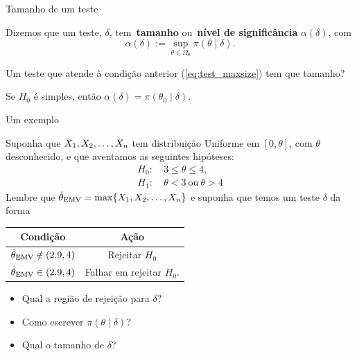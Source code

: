  
\begin{frame}{Tamanho de um teste}
 \begin{defn}
 Dizemos que um teste, $\delta$, tem~\textbf{tamanho} ou~\textbf{nível de significância} $\alpha(\delta)$, com 
 \begin{equation*}
  \alpha(\delta) := \sup_{\theta \in \Omega_0} \pi(\theta \mid \delta).
 \end{equation*}
 \end{defn}
Um teste que atende à condição anterior (\ref{eq:test_maxsize}) tem que tamanho?

\begin{obs}
 Se $H_0$ é simples, então $\alpha(\delta) = \pi(\theta_0 \mid \delta)$.
\end{obs}

\end{frame}

\begin{frame}{Um exemplo}
 \begin{exemplo}
  Suponha que $X_1, X_2, \ldots, X_n$ tem distribuição Uniforme em $[0, \theta]$, com $\theta$ desconhecido, e que aventamos as seguintes hipóteses:
  \begin{align*}
   H_0:&\: 3 \leq \theta \leq 4, \\
   H_1:&\:  \theta < 3 \:\text{ou}\: \theta > 4
  \end{align*}
  Lembre que $\hat{\theta}_{\text{EMV}} = \max\{X_1, X_2, \ldots, X_n\}$ e suponha que temos um teste $\delta$ da forma  
   \begin{center}
  \begin{tabular}{cc}
   Condição & Ação \\
   \hline
   $\hat{\theta}_{\text{EMV}} \notin (2.9, 4)$ & Rejeitar $H_0$ \\
   $\hat{\theta}_{\text{EMV}} \in (2.9, 4)$ & Falhar em rejeitar $H_0$.\\
   \hline
  \end{tabular}
 \end{center}  
 \end{exemplo}
\begin{itemize}
 \item Qual a região de rejeição para $\delta$?
 \item Como escrever $\pi(\theta \mid \delta)$?
 \item Qual o tamanho de $\delta$?
\end{itemize}
\end{frame}

